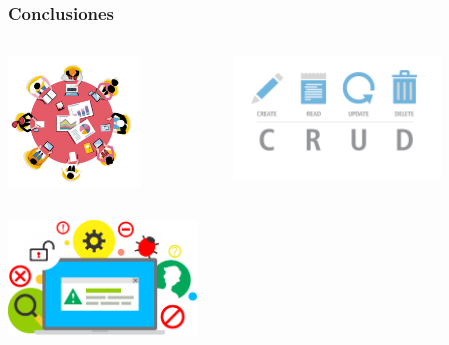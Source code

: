 \documentclass[xcolor=dvipsnames, xcolor=table]{beamer}
\begin{document}
\begin{frame}
    \frametitle{Conclusiones}
    \vspace{-2mm}
    \begin{columns}
      \begin{column}{0.4\textwidth}
        
        \centering\includegraphics[width=3.5cm]{center}
      \end{column}
      \begin{column}{0.6\textwidth}
        
        \centering\includegraphics[width=5.5cm]{crud}
      \end{column}
      
    \end{columns}
    \begin{columns}
      
      \begin{column}{1\textwidth}
        
\centering\includegraphics[width=5cm]{desarrollo}
      \end{column}
    \end{columns}
\end{frame}
\end{document}
